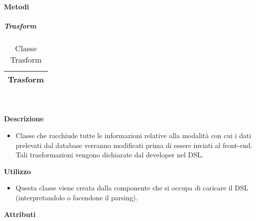 		\textbf{Metodi} 
	\begin{itemize}
		\end{itemize}
			\subparagraph{Trasform} 
\begin{table}[ht]
\begin{center}
\bgroup
	\setlength{\arrayrulewidth}{0.6mm}
	\def\arraystretch{1}
		\begin{tabular}{ | p{12cm} | }
				\hline  
					\centerline{\textbf{Trasform}}
		\\ \hline 
				\hline
				\hline
		
		\end{tabular}
\egroup
\caption{Classe Trasform}
\end{center}
\end{table}  \textbf{\\ \\ Descrizione} 
					\begin{itemize}
						\item[] Classe che racchiude tutte le informazioni relative alla modalità con cui i dati prelevati dal database verranno modificati prima di essere inviati al front-end.
Tali trasformazioni vengono dichiarate dal developer nel DSL.
					\end{itemize}      
				\textbf{Utilizzo}  
					\begin{itemize}
						\item[] Questa classe viene creata dalla componente che si occupa di caricare il DSL (interpretandolo o facendone il parsing).
					\end{itemize}
			 \textbf{Attributi} 
	\begin{itemize}
		\end{itemize}
		
